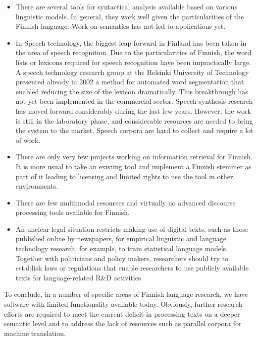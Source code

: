 \documentclass[]{../../metanetpaper}
\begin{document}
\begin{Parallel}[c]{70mm}{70mm}
{\begin{itemize}
\item There are several tools for syntactical analysis available based on various
    linguistic models. In general, they work well given the particularities of
    the Finnish language. Work on semantics has not led to applications yet.

\item In Speech technology, the biggest leap forward in Finland has been taken in
    the area of speech recognition. Due to the particularities of Finnish, the
    word lists or lexicons required for speech recognition have been
    impractically large. A speech technology research group at the Helsinki
    University of Technology presented already in 2002 a method for automated
    word segmentation that enabled reducing the size of the lexicon
    dramatically. This breakthrough has not yet been implemented in the
    commercial sector. Speech synthesis research has moved forward considerably
    during the last few years. However, the work is still in the laboratory
    phase, and considerable resources are needed to bring the system to the
    market. Speech corpora are hard to collect and require a lot of work.

\item There are only very few projects working on information retrieval for
    Finnish. It is more usual to take an existing tool and implement a Finnish
    stemmer as part of it leading to licensing and limited rights to use the
    tool in other environments.

\item There are few multimodal resources and virtually no advanced discourse
    processing tools available for Finnish.

\item An unclear legal situation restricts making use of digital texts, such as
    those published online by newspapers, for empirical linguistic and language
    technology research, for example, to train statistical language models.
    Together with politicians and policy makers, researchers should try to
    establish laws or regulations that enable researchers to use publicly
    available texts for language-related R\&D activities.
\end{itemize}

To conclude, in a number of specific areas of Finnish language research, we
have software with limited functionality available today. Obviously, further
research efforts are required to meet the current deficit in processing texts
on a deeper semantic level and to address the lack of resources such as
parallel corpora for machine translation.
}


\end{Parallel}
\end{document}
